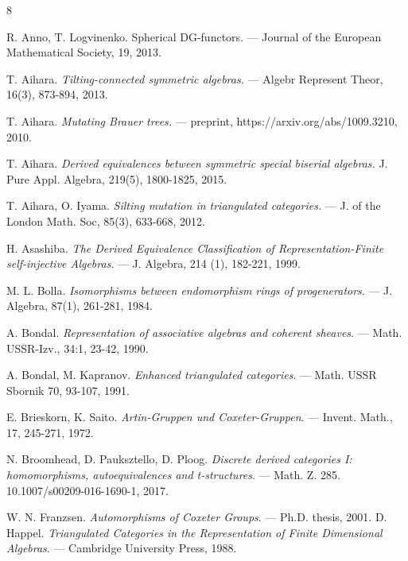 \documentclass[12pt]{amsart}
\theoremstyle{plain}
\theoremstyle{remark}
\theoremstyle{definition}
\begin{document}
\begin{thebibliography}{8}

 R. Anno, T. Logvinenko. {Spherical DG-functors}. --- Journal of the European Mathematical Society, 19, 2013. 

 T. Aihara. {\it Tilting-connected symmetric algebras.} --- Algebr Represent Theor, 16(3), 873-894, 2013. 

 T. Aihara. {\it Mutating Brauer trees.} --- preprint, https://arxiv.org/abs/1009.3210, 2010. 

  T. Aihara. {\it Derived equivalences between symmetric special biserial algebras.} J. Pure Appl. Algebra, 219(5), 1800-1825, 2015. 

 T. Aihara, O. Iyama. {\it  Silting mutation in triangulated categories.} --- J. of the London Math. Soc, 85(3), 633-668, 2012. 

H. Asashiba. {\it The Derived Equivalence Classification of Representation-Finite self-injective Algebras}. --- J. Algebra, 214 (1), 182-221, 1999. 



 M. L. Bolla. {\it Isomorphisms between endomorphism rings of progenerators}. --- J. Algebra, 87(1), 261-281, 1984. 


 A. Bondal. {\it Representation of associative algebras and coherent sheaves}. --- Math. USSR-Izv., 34:1, 23-42, 1990.

 A. Bondal, M. Kapranov. {\it Enhanced triangulated categories}. --- Math. USSR Sbornik 70, 93-107, 1991. 



E. Brieskorn, K. Saito. {\it Artin-Gruppen und Coxeter-Gruppen}. --- Invent. Math., 17, 245-271, 1972. 


 N. Broomhead, D. Pauksztello, D. Ploog. {\it  Discrete derived categories I: homomorphisms, autoequivalences and t-structures}. --- Math. Z. 285. 10.1007/s00209-016-1690-1, 2017.

 W. N. Franzsen. {\it Automorphisms of Coxeter Groups}. --- Ph.D. thesis, 2001. 
 D. Happel. {\it Triangulated Categories in the Representation of Finite Dimensional Algebras}. --- Cambridge University Press, 1988. 


\end{thebibliography}
\end{document}
